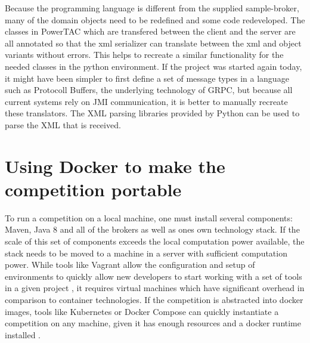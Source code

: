 Because the programming language is different from the supplied sample-broker, many of the domain objects need to be
redefined and some code redeveloped. The classes in \ac {PowerTAC} which are transfered between the client and the
server are all annotated so that the xml serializer can translate between the xml and object variants without errors.
This helps to recreate a similar functionality for the needed classes in the python environment. If the project was
started again today, it might have been simpler to first define a set of message types in a language such as Protocoll
Buffers, the underlying technology of \ac {GRPC}, but because all current systems rely on \ac {JMI} communication, it is
better to manually recreate these translators. The \ac {XML} parsing libraries provided by Python can be used to parse
the \ac {XML} that is received.  


\section{Using Docker to make the competition portable}%
\label{sec:using_docker_to_make_the_competition_portable}

To run a competition on a local machine, one must install several components: Maven, Java 8 and all of the brokers as
well as ones own technology stack. If the scale of this set of components exceeds the local computation power available,
the stack needs to be moved to a machine in a server with sufficient computation power. While tools like Vagrant allow
the configuration and setup of environments to quickly allow new developers to start working with a set of tools in a
given project \citep{vagrant} , it requires virtual machines which have significant overhead in comparison to container
technologies. If the competition is abstracted into docker images, tools like Kubernetes or Docker Compose can quickly
instantiate a competition on any machine, given it has enough resources and a docker runtime installed \citep{docker}.

